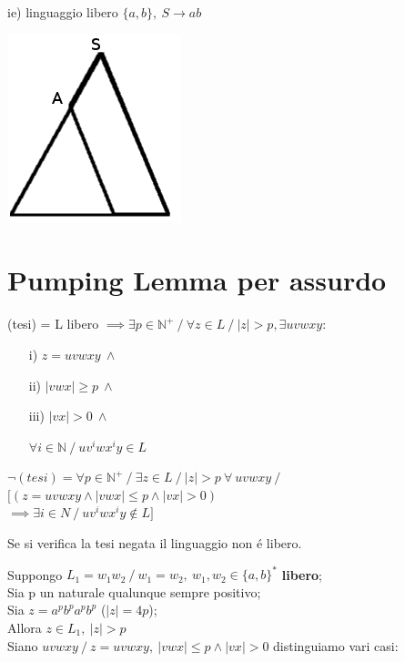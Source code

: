 ie) linguaggio libero $\{a,b\},\ S \rightarrow ab$ 
\begin{center}
\includegraphics[scale=0.4]{Chapters/Img/c01_04.png}
\end{center}


\section{Pumping Lemma per assurdo}
(tesi) = L libero $ \implies \exists p \in \mathbb{N}^+ \ / \ \forall z \in L \ / \ |z| > p,\exists u v w x y:$
\begin{itemize}
	\item[i)] 	$z = uvwxy\ \land$ \\
	\item[ii)] 	$|vwx| \geq p\ \land$ \\
	\item[iii)] $|vx| > 0 \ \land$ \\
	\item[ ] 	$\forall i \in \mathbb{N} \ / \ uv^iwx^iy \in L$\\
\end{itemize}
$\neg (tesi) = \forall p \in \mathbb{N}^+ \ / \ \exists z \in L \ / \ |z| > p\ \forall\ uvwxy \ / \ $
$[(z = uvwxy \land |vwx| \leq p \land |vx| > 0)$\\
$\implies \exists i \in N \ / \ uv^iwx^iy \not\in L]$\\[5pt]
\begin{tcolorbox}\begin{center}
	Se si verifica la tesi negata il linguaggio non \'e libero.\\
\end{center}\end{tcolorbox}
Suppongo $L_1 = { w_1 w_2 \ / \ w_1 = w_2,\ w_1, w_2 \in \{a, b\}^*}$ \textbf{libero};\\
Sia p un naturale qualunque sempre positivo;\\
Sia $z = a^p b^p a^p b^p$ ($|z| = 4p$);\\
Allora $z \in L_1,\ |z| > p$\\
Siano $uvwxy \ / \ z=uvwxy,\ |vwx| \leq p \land |vx| > 0$ distinguiamo vari casi:

